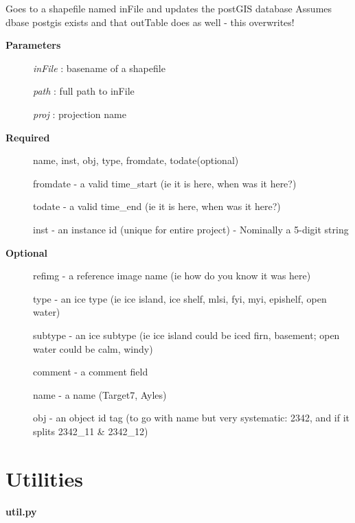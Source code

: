 \documentclass[letterpaper,10pt,english]{sphinxmanual}
\begin{document}
\begin{fulllineitems}

\begin{fulllineitems}
\label{code:Database.Database.update_NTAI_FLUX_ROI}
Goes to a shapefile named inFile and updates the postGIS database
Assumes dbase postgis exists and that outTable does as well - this overwrites!
\begin{description}
\item[{\textbf{Parameters}}] \leavevmode
\emph{inFile}    :    basename of a shapefile

\emph{path}  :   full path to inFile

\emph{proj}  :   projection name

\item[{\textbf{Required}}] \leavevmode
name, inst, obj, type, fromdate, todate(optional)

fromdate - a valid time\_start (ie it is here, when was it here?)

todate - a valid time\_end (ie it is here, when was it here?)

inst - an instance id (unique for entire project) - Nominally a 5-digit string

\item[{\textbf{Optional}}] \leavevmode
refimg - a reference image name (ie how do you know it was here)

type - an ice type (ie ice island, ice shelf, mlsi, fyi, myi, epishelf, open water)

subtype - an ice subtype (ie ice island could be iced firn, basement; open water could be calm, windy)

comment - a comment field

name - a name (Target7, Ayles)

obj - an object id tag (to go with name but very systematic: 2342, and if it splits 2342\_11 \& 2342\_12)

\end{description}

\end{fulllineitems}


\end{fulllineitems}



\section{Utilities}
\label{code:utilities}\label{code:module-Util}
\textbf{util.py}
\end{document}
